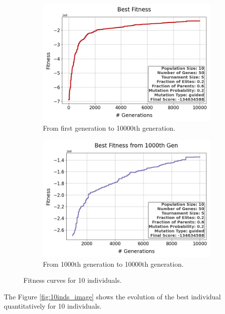 \documentclass{assignment}
\begin{document}
\begin{figure}[H]
    \begin{subfigure}{0.5\textwidth}
        \includegraphics[width=\textwidth]{figures/best_fitness_output_10_50_5_0.2_0.6_0.2_guided.png}
        \caption{From first generation to 10000th generation.}
    \end{subfigure}\hfill
    \begin{subfigure}{0.5\textwidth}
        \includegraphics[width=\textwidth]{figures/best_fitness_1000_output_10_50_5_0.2_0.6_0.2_guided.png}
        \caption{From 1000th generation to 10000th generation.}
    \end{subfigure}
    \caption{Fitness curves for 10 individuals.}
\label{fig:10inds}
\end{figure}

The Figure \ref{fig:10inds_image} shows the evolution of the best individual quantitatively for 10 individuals.
\end{document}
